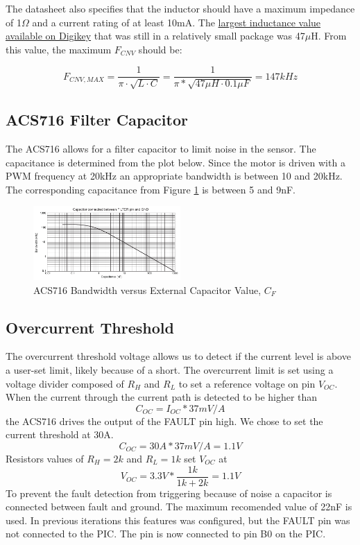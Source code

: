 \documentclass{article}
\begin{document}
The datasheet also specifies that the inductor should have a maximum impedance of 1$\Omega$ and a current rating of at least 10mA. The \href{http://www.digikey.com/product-detail/en/LBC3225T470KR/587-2430-1-ND/2230296}{largest inductance value available on Digikey} that was still in a relatively small package was 47$\mu$H. From this value, the maximum $F_{CNV}$ should be:

\[F_{CNV,MAX} =\frac{1}{\pi \cdot \sqrt{L\cdot C}} = \frac{1}{\pi * \sqrt{47\mu H \cdot0.1 \mu F}}= 147kHz\]

\subsection{ACS716 Filter Capacitor}
The ACS716 allows for a filter capacitor to limit noise in the sensor. The capacitance is determined from the plot below. Since the motor is driven with a PWM frequency at 20kHz an appropriate bandwidth is between 10 and 20kHz. The corresponding capacitance from Figure \ref{fig:filter} is between 5 and 9nF.
\begin{figure}[h]
	\centering
	\includegraphics[width=0.5\textwidth]{acs716filter}
	\caption{ACS716 Bandwidth versus External Capacitor Value, $C_F$\protect\footnotemark}
	\label{fig:filter}
\end{figure}
\subsection{Overcurrent Threshold}
The overcurrent threshold voltage allows us to detect if the current level is above a user-set limit, likely because of a short. The overcurrent limit is set using a voltage divider composed of $R_H$ and $R_L$ to set a reference voltage on pin $V_{OC}$. When the current through the current path is detected to be higher than 
\[C_{OC} = I_{OC}*37mV/A\] 
the ACS716 drives the output of the FAULT pin high. We chose to set the current threshold at 30A. 
\[C_{OC} = 30A*37mV/A=1.1V\] 
Resistors values of $R_H=2k$ and $R_L=1k$ set $V_{OC}$ at 
\[V_{OC} = 3.3V*\frac{1k}{1k+2k}=1.1V\]
To prevent the fault detection from triggering because of noise a capacitor is connected between fault and ground. The maximum recomended value of 22nF is used.
In previous iterations this features was configured, but the FAULT pin was not connected to the PIC. The pin is now connected to pin B0 on the PIC.
\end{document}
